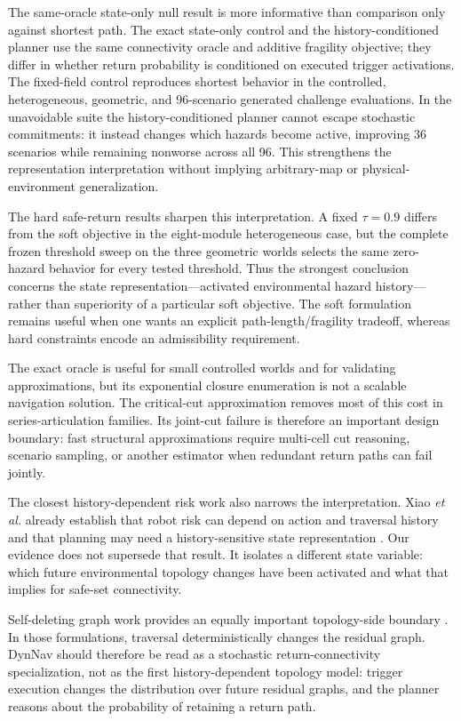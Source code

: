 \documentclass[conference]{IEEEtran}
\begin{document}
The same-oracle state-only null result is more informative than comparison only against shortest path. The exact state-only control and the history-conditioned planner use the same connectivity oracle and additive fragility objective; they differ in whether return probability is conditioned on executed trigger activations. The fixed-field control reproduces shortest behavior in the controlled, heterogeneous, geometric, and 96-scenario generated challenge evaluations. In the unavoidable suite the history-conditioned planner cannot escape stochastic commitments: it instead changes which hazards become active, improving 36 scenarios while remaining nonworse across all 96. This strengthens the representation interpretation without implying arbitrary-map or physical-environment generalization.

The hard safe-return results sharpen this interpretation. A fixed $\tau=0.9$ differs from the soft objective in the eight-module heterogeneous case, but the complete frozen threshold sweep on the three geometric worlds selects the same zero-hazard behavior for every tested threshold. Thus the strongest conclusion concerns the state representation---activated environmental hazard history---rather than superiority of a particular soft objective. The soft formulation remains useful when one wants an explicit path-length/fragility tradeoff, whereas hard constraints encode an admissibility requirement.

The exact oracle is useful for small controlled worlds and for validating approximations, but its exponential closure enumeration is not a scalable navigation solution. The critical-cut approximation removes most of this cost in series-articulation families. Its joint-cut failure is therefore an important design boundary: fast structural approximations require multi-cell cut reasoning, scenario sampling, or another estimator when redundant return paths can fail jointly.

The closest history-dependent risk work also narrows the interpretation. Xiao \emph{et al.} already establish that robot risk can depend on action and traversal history and that planning may need a history-sensitive state representation \cite{xiao2020risk}. Our evidence does not supersede that result. It isolates a different state variable: which future environmental topology changes have been activated and what that implies for safe-set connectivity.

Self-deleting graph work provides an equally important topology-side boundary \cite{carmesin2023selfdeleting,dvorak2025selfdeleting,frenkel2026selfinduced}. In those formulations, traversal deterministically changes the residual graph. DynNav should therefore be read as a stochastic return-connectivity specialization, not as the first history-dependent topology model: trigger execution changes the distribution over future residual graphs, and the planner reasons about the probability of retaining a return path.
\end{document}
